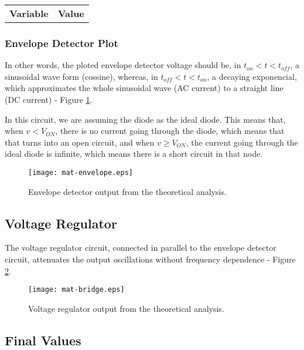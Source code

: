 \begin{tabular}{|l|r|}
  \hline    
  {\bf Variable} & {\bf Value} \\ %
\end{tabular}

\subsubsection{Envelope Detector Plot}

In other words, the ploted envelope detector voltage should be, in $t_{on} < t < t_{off}$, a sinusoidal wave form (cossine), whereas, in $t_{off} < t < t_{on}$, a decaying exponencial, which approximates the whole sinusoidal wave (AC current) to a straight line (DC current) - Figure \ref{fig:mat-envelope}.

In this circuit, we are assuming the diode as the ideal diode. This means that, when $v < V_{ON}$, there is no current going through the diode, which means that that turns into an open circuit, and when $v \geq V_{ON}$, the current going through the ideal diode is infinite, which means there is a short circuit in that node.

\begin{figure}[h] \centering
\texttt{[image: mat-envelope.eps]}
\caption{Envelope detector output from the theoretical analysis.}
\label{fig:mat-envelope}
\end{figure}

\subsection{Voltage Regulator}

The voltage regulator circuit, connected in parallel to the envelope detector circuit, attenuates the output oscillations without frequency dependence - Figure \ref{fig:mat-bridge}.

\begin{figure}[h] \centering
\texttt{[image: mat-bridge.eps]}
\caption{Voltage regulator output from the theoretical analysis.}
\label{fig:mat-bridge}
\end{figure}

\subsection{Final Values}

